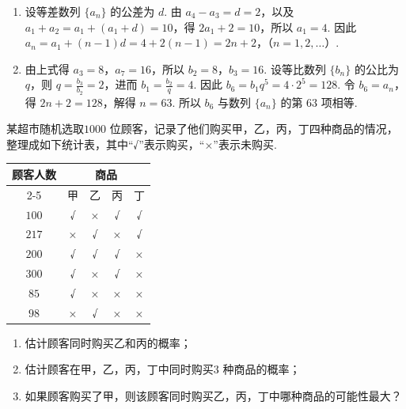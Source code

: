 \begin{solution}
\begin{enumerate}
\item 设等差数列 \(\{a_n\}\) 的公差为 \(d\). 由 \(a_4-a_3=d=2\)，以及 \(a_1+a_2=a_1+(a_1+d)=10\)，得 \(2a_1+2=10\)，所以 \(a_1=4\). 因此
\(a_n=a_1+(n-1)d=4+2(n-1)=2n+2\)，（\(n=1,2,\ldots\)）.
\item 由上式得 \(a_3=8\)，\(a_7=16\)，所以 \(b_2=8\)，\(b_3=16\). 设等比数列 \(\{b_n\}\) 的公比为 \(q\)，则 \(q=\frac{b_3}{b_2}=2\)，进而 \(b_1=\frac{b_2}{q}=4\). 因此 \(b_6=b_1q^5=4\cdot2^5=128\). 令 \(b_6=a_n\)，得 \(2n+2=128\)，解得 \(n=63\). 所以 \(b_6\) 与数列 \(\{a_n\}\) 的第 \(63\) 项相等.
\end{enumerate}
\end{solution}

\begin{problem}
某超市随机选取\(1000\text{ 位}\)顾客，记录了他们购买甲，乙，丙，丁四种商品的情况，整理成如下统计表，其中“√”表示购买，“×”表示未购买.

\begin{center}
\renewcommand{\arraystretch}{1.2}
\begin{tabular}{c|cccc}
\hline
顾客人数 & \multicolumn{4}{c}{商品} \\
\cline{2-5}
 & 甲 & 乙 & 丙 & 丁 \\
\hline
\(100\) & √ & × & √ & √ \\
\(217\) & × & √ & × & √ \\
\(200\) & √ & √ & √ & × \\
\(300\) & √ & × & √ & × \\
\(85\) & √ & × & × & × \\
\(98\) & × & √ & × & × \\
\hline
\end{tabular}
\end{center}

\begin{enumerate}
\item 估计顾客同时购买乙和丙的概率；
\item 估计顾客在甲，乙，丙，丁中同时购买\(3\text{ 种}\)商品的概率；
\item 如果顾客购买了甲，则该顾客同时购买乙，丙，丁中哪种商品的可能性最大？
\end{enumerate}
\end{problem}

